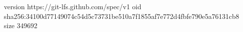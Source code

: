 version https://git-lfs.github.com/spec/v1
oid sha256:34100d77149074c54d5c73731be510a7f1855af7e772d4fbfe790e5a76131cb8
size 349692
